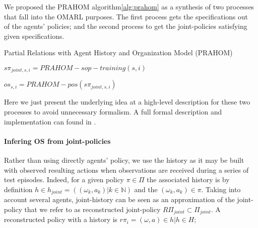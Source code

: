 \documentclass[runningheads]{llncs}
\begin{document}
We proposed the PRAHOM algorithm\autoref{alg:prahom} as a synthesis of two processes that fall into the OMARL purposes. The first process gets the specifications out of the agents' policies; and the second process to get the joint-policies satisfying given specifications.


\begin{algorithm}[hbt!]
    \caption{Partial Relations with Agent History and Organization Model (PRAHOM)}\label{alg:prahom}



    $s\pi_{joint,s,i} = PRAHOM-sop-training(s,i)$

    $os_{s,i} = PRAHOM-pos(s\pi_{joint,s,i})$

\end{algorithm}

Here we just present the underlying idea at a high-level description for these two processes to avoid unnecessary formalism. A full formal description and implementation can found in \cite{}.

\paragraph{\textbf{Infering OS from joint-policies}}

Rather than using directly agents' policy, we use the history as it may be built with observed resulting actions when observations are received during a series of test episodes. Indeed, for a given policy $\pi \in \Pi$ the associated history is by definition $h \in h_{joint} = ((\omega_k,a_k) | k \in \mathbb{N})$ and the $(\omega_k,a_k) \in \pi$. Taking into account several agents, joint-history can be seen as an approximation of the joint-policy that we refer to as reconstructed joint-policy $R\Pi_{joint} \subset \Pi_{joint}$. A reconstructed policy with a history is $r\pi_i = {(\omega, a) \in h | h \in H}$;
\end{document}
